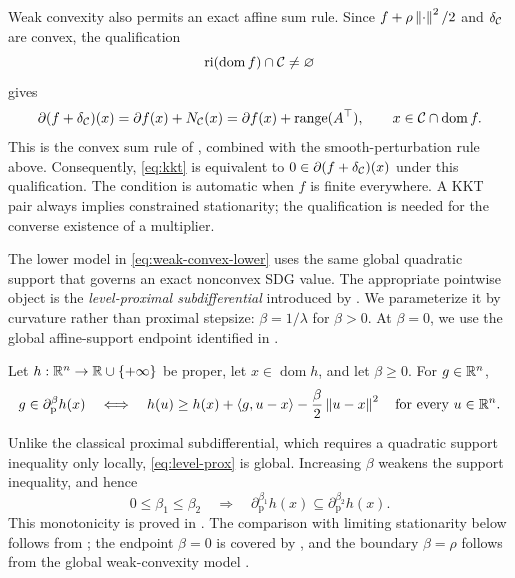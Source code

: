 Weak convexity also permits an exact affine sum rule.  Since
\(f+\rho\left\lVert \cdot\right\rVert^{2}/2\) and \(\delta_{\mathcal{C}}\) are convex, the qualification
\[
  \operatorname{ri}(\operatorname{dom}f)\cap\mathcal{C}\ne\varnothing
\]
gives
\begin{equation}
  \partial(f+\delta_{\mathcal{C}})(x)
  =\partial f(x)+N_{\mathcal{C}}(x)
  =\partial f(x)+\operatorname{range}(A^\top),\qquad x\in\mathcal{C}\cap\operatorname{dom} f.
  \label{eq:affine-sum-rule}
\end{equation}
This is the convex sum rule of \citet[Theorem~23.8]{Rockafellar1970},
combined with the smooth-perturbation rule above.  Consequently,
\cref{eq:kkt} is equivalent to
\(0\in\partial(f+\delta_{\mathcal{C}})(x)\) under this qualification.
The condition is automatic when \(f\) is finite everywhere.  A KKT pair
always implies constrained stationarity; the qualification is needed for
the converse existence of a multiplier.

The lower model in \cref{eq:weak-convex-lower} uses the same global
quadratic support that governs an exact nonconvex SDG value.  The appropriate
pointwise object is the \emph{level-proximal subdifferential} introduced by
\citet[Definition~3.2]{WangWang2024}.  We parameterize it by curvature rather
than proximal stepsize: \(\beta=1/\lambda\) for \(\beta>0\).  At
\(\beta=0\), we use the global affine-support endpoint identified in
\citet[Proposition~3.6(v)]{WangWang2024}.

\begin{definition}
  \label{def:level-prox}
  Let \(h:\mathbb{R}^n\to\mathbb{R}\cup\{+\infty\}\) be proper, let
  \(x\in\operatorname{dom}h\), and let \(\beta\ge0\).  For
  \(g\in\mathbb{R}^n\),
  \begin{equation}
    g\in\partial_{\mathrm p}^{\beta}h(x)
    \quad\Longleftrightarrow\quad
    h(u)\ge h(x)+\left\langle g,u-x\right\rangle
      -\frac{\beta}{2}\left\lVert u-x\right\rVert^2
    \quad\text{for every }u\in\mathbb{R}^n .
    \label{eq:level-prox}
  \end{equation}
\end{definition}

Unlike the classical proximal subdifferential, which requires a quadratic
support inequality only locally, \cref{eq:level-prox} is global.  Increasing
\(\beta\) weakens the support inequality, and hence
\begin{equation}
  0\le\beta_1\le\beta_2
  \quad\Longrightarrow\quad
  \partial_{\mathrm p}^{\beta_1}h(x)
  \subseteq
  \partial_{\mathrm p}^{\beta_2}h(x).
  \label{eq:level-prox-monotonicity}
\end{equation}
This monotonicity is proved in
\citet[Proposition~3.6(ii)]{WangWang2024}.  The comparison with limiting
stationarity below follows from
\citet[Proposition~3.4(ii), Proposition~3.6(iv), and
Theorem~3.9(i)]{WangWang2024}; the endpoint \(\beta=0\) is covered by
\citet[Proposition~3.6(v)]{WangWang2024}, and the boundary
\(\beta=\rho\) follows from the global weak-convexity model
\citep[Lemma~2.1]{DavisDrusvyatskiy2019}.

